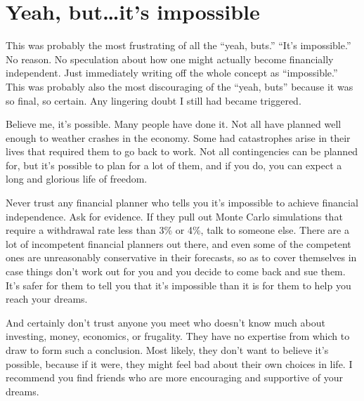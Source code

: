 \section{Yeah, but\ldots it's impossible}
This was probably the most frustrating of all the ``yeah, buts.'' ``It's impossible.'' No reason. No speculation about how one might actually become financially independent. Just immediately writing off the whole concept as ``impossible.'' This was probably also the most discouraging of the ``yeah, buts'' because it was so final, so certain. Any lingering doubt I still had became triggered.

Believe me, it's possible. Many people have done it. Not all have planned well enough to weather crashes in the economy. Some had catastrophes arise in their lives that required them to go back to work. Not all contingencies can be planned for, but it's possible to plan for a lot of them, and if you do, you can expect a long and glorious life of freedom.

Never trust any financial planner who tells you it's impossible to achieve financial independence. Ask for evidence. If they pull out Monte Carlo simulations that require a withdrawal rate less than 3\% or 4\%, talk to someone else. There are a lot of incompetent financial planners out there, and even some of the competent ones are unreasonably conservative in their forecasts, so as to cover themselves in case things don't work out for you and you decide to come back and sue them. It's safer for them to tell you that it's impossible than it is for them to help you reach your dreams.

And certainly don't trust anyone you meet who doesn't know much about investing, money, economics, or frugality. They have no expertise from which to draw to form such a conclusion. Most likely, they don't want to believe it's possible, because if it were, they might feel bad about their own choices in life. I recommend you find friends who are more encouraging and supportive of your dreams.
